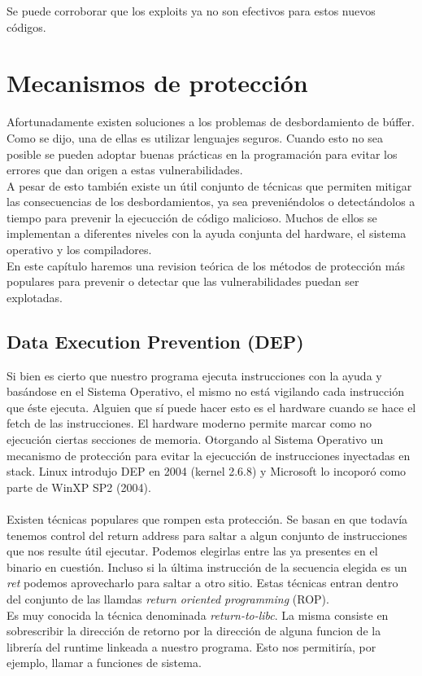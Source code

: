\documentclass[12pt]{article}
\begin{document}
Se puede corroborar que los exploits ya no son efectivos para estos nuevos códigos.


\section{Mecanismos de protección}

Afortunadamente existen soluciones a los problemas de desbordamiento de búffer. Como se dijo, una de ellas es utilizar lenguajes seguros. Cuando esto no sea posible se pueden adoptar buenas prácticas en la programación para evitar los errores que dan origen a estas vulnerabilidades. \\
A pesar de esto también existe un útil conjunto de técnicas que permiten mitigar las consecuencias de los desbordamientos, ya sea preveniéndolos o detectándolos a tiempo para prevenir la ejecucción de código malicioso. Muchos de ellos se implementan a diferentes niveles con la ayuda conjunta del hardware, el sistema operativo y los compiladores. \\
En este capítulo haremos una revision teórica de los métodos de protección más populares para prevenir o detectar que las vulnerabilidades puedan ser explotadas.

\subsection{Data Execution Prevention (DEP)}
 Si bien es cierto que nuestro programa ejecuta instrucciones con la ayuda y basándose en el Sistema Operativo, el mismo no está vigilando cada instrucción que éste ejecuta. Alguien que sí puede hacer esto es el hardware cuando se hace el fetch de las instrucciones. El hardware moderno permite marcar como no ejecución ciertas secciones de memoria. Otorgando al Sistema Operativo un mecanismo de protección para evitar la ejecucción de instrucciones inyectadas en stack.
Linux introdujo DEP en 2004 (kernel 2.6.8) y Microsoft lo incoporó como parte de WinXP SP2 (2004). \\ \\
Existen técnicas populares que rompen esta protección. Se basan en que todavía tenemos control del return address para saltar a algun conjunto de instrucciones que nos resulte útil ejecutar. Podemos elegirlas entre las ya presentes en el binario en cuestión. Incluso si la última instrucción de la secuencia elegida es un \textit{ret} podemos aprovecharlo para saltar a otro sitio. Estas técnicas entran dentro del conjunto de las llamdas \textit{return oriented programming} (ROP). \\
Es muy conocida la técnica denominada \textit{return-to-libc}. La misma consiste en sobrescribir la dirección de retorno por la dirección de alguna funcion de la librería del runtime linkeada a nuestro programa. Esto nos permitiría, por ejemplo, llamar a funciones de sistema.
\end{document}
